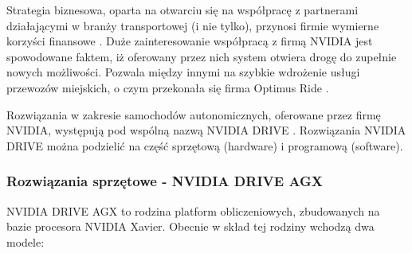 Strategia biznesowa, oparta na otwarciu się na współpracę z partnerami działającymi w branży transportowej (i nie tylko), przynosi firmie wymierne korzyści finansowe \cite{nvidia:financialSuccess}. 
Duże zainteresowanie współpracą z firmą NVIDIA jest spowodowane faktem, iż oferowany przez nich system otwiera drogę do zupełnie nowych możliwości. Pozwala między innymi na szybkie wdrożenie usługi przewozów miejskich, o czym przekonała się firma Optimus Ride \cite{nvidia:optimusRide}.

Rozwiązania w zakresie samochodów autonomicznych, oferowane przez firmę NVIDIA, występują pod wspólną nazwą NVIDIA DRIVE \cite{nvidia:drive}. Rozwiązania NVIDIA DRIVE można podzielić na część sprzętową (hardware) i programową (software).

\subsubsection{Rozwiązania sprzętowe - NVIDIA DRIVE AGX}
NVIDIA DRIVE AGX to rodzina platform obliczeniowych, zbudowanych na bazie procesora NVIDIA Xavier.
Obecnie w skład tej rodziny wchodzą dwa modele:
